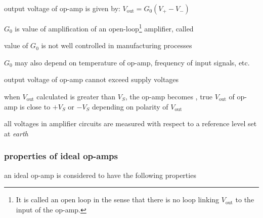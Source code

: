 \cmt output voltage of op-amp is given by: $\boxed{V_\text{out}= G_0(V_+ - V_-)}$

$G_0$ is value of amplification of an open-loop\footnote{It is called an open loop in the sense that there is no loop linking $V_\text{out}$ to the input of the op-amp.} amplifier, called 

\cmt value of $G_0$ is not well controlled in manufacturing processes

$G_0$ may also depend on temperature of op-amp, frequency of input signals, etc.

\cmt output voltage of op-amp cannot exceed supply voltages

when $V_\text{out}$ calculated is greater than $V_S$, the op-amp becomes , true $V_\text{out}$ of op-amp is close to $+V_S$ or $-V_S$ depending on polarity of $V_\text{out}$

\cmt all voltages in amplifier circuits are measured with respect to a reference level set at \emph{earth}

\subsubsection*{properties of ideal op-amps}

an ideal op-amp is considered to have the following properties

